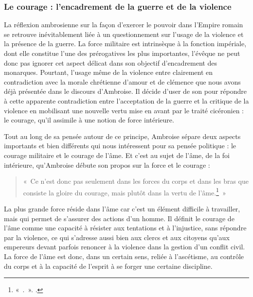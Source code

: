 \bigskip

\subsubsection{Le courage : l'encadrement de la guerre et de la violence}

La réflexion ambrosienne sur la façon d'exercer le pouvoir dans l'Empire romain se retrouve inévitablement liée à un questionnement sur l'usage de la violence et la présence de la guerre. La force militaire est intrinsèque à la fonction impériale, dont elle constitue l'une des prérogatives les plus importantes, l'évêque ne peut donc pas ignorer cet aspect délicat dans son objectif d'encadrement des monarques. Pourtant, l'usage même de la violence entre clairement en contradiction avec la morale chrétienne d'amour et de clémence que nous avons déjà présentée dans le discours d'Ambroise. Il décide d'user de son  pour répondre à cette apparente contradiction entre l'acceptation de la guerre et la critique de la violence en mobilisant une nouvelle vertu mise en avant par le traité cicéronien : le courage, qu'il assimile à une notion de force intérieure.

\bigskip

Tout au long de sa pensée autour de ce principe, Ambroise sépare deux aspects importants et bien différents qui nous intéressent pour sa pensée politique : le courage militaire et le courage de l'âme\autocite[\nopp I, 175-196]{ambroise_devoirs_1}. Et c'est au sujet de l'âme, de la foi intérieure, qu'Ambroise débute son propos sur la force et le courage :

\begin{quote}
«~Ce n’est donc pas seulement dans les forces du corps et dans les bras que consiste la gloire du courage, mais plutôt dans la vertu de l’âme.\footnote{«~.~». \cite[\nopp I, 179]{ambroise_devoirs_1}.}~»
\end{quote}

\bigskip

La plus grande force réside dans l'âme car c'est un élément difficile à travailler, mais qui permet de s'assurer des actions d'un homme. Il définit le courage de l’âme comme une capacité à résister aux tentations et à l’injustice, sans répondre par la violence, ce qui s'adresse aussi bien aux clercs et aux citoyens qu'aux empereurs devant parfois renoncer à la violence dans la gestion d'un conflit civil. La force de l'âme est donc, dans un certain sens, reliée à l'ascétisme, au contrôle du corps et à la capacité de l'esprit à se forger une certaine discipline.

